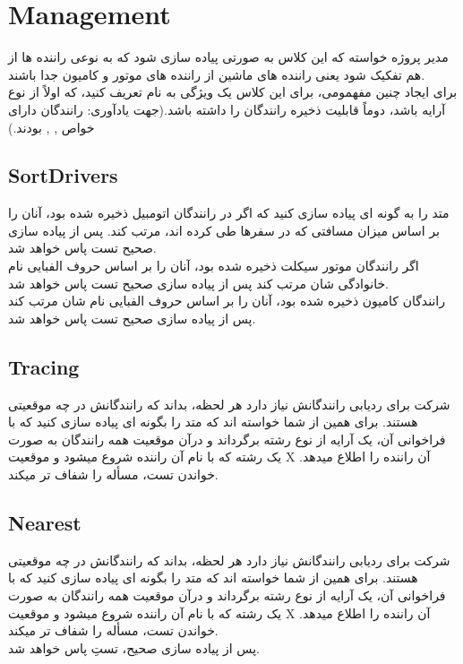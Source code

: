 \section{Management}
مدیر پروژه خواسته که این کلاس به صورتی پیاده سازی شود که به نوعی راننده ها از هم تفکیک شود یعنی راننده های ماشین از راننده های موتور و کامیون جدا باشند.
\\
برای ایجاد چنین مفهمومی، برای این کلاس یک ویژگی  به نام  تعریف کنید، که اولاً از نوع آرایه باشد، دوماً قابلیت ذخیره رانندگان را داشته باشد.(جهت یادآوری: رانندگان دارای خواص 
,
,
بودند.)
\\
\subsection{SortDrivers}
متد 
\grayBox{\textcolor{blue}{SortDrivers}}
را به گونه ای پیاده سازی کنید که اگر در 
رانندگان اتومبیل ذخیره شده بود، آنان را بر اساس میزان مسافتی که در سفرها طی کرده اند، مرتب کند.
پس از پیاده سازی صحیح تست 
\grayBox{\textcolor{dkgreen}{SortCarDriversTest}}
پاس خواهد شد.
\\
اگر
رانندگان موتور سیکلت ذخیره شده بود، آنان را بر اساس حروف الفبایی نام خانوادگی شان مرتب کند
 پس از پیاده سازی صحیح تست 
\grayBox{\textcolor{dkgreen}{SortMotorCycleDriversTest}}
پاس خواهد شد.
\\
رانندگان کامیون ذخیره شده بود، آنان را بر اساس حروف الفبایی نام شان مرتب کند
پس از پیاده سازی صحیح تست 
\grayBox{\textcolor{dkgreen}{SortTruckDriversTest}}
پاس خواهد شد.
\subsection{Tracing}
شرکت برای ردیابی رانندگانش نیاز دارد هر لحظه، بداند که رانندگانش در چه موقعیتی هستند.
برای همین از شما خواسته اند که متد 
\grayBox{\textcolor{blue}{WhereIsNow}}
را بگونه ای پیاده سازی کنید که با فراخوانی آن، یک آرایه از نوع رشته برگرداند و درآن موقعیت همه رانندگان به صورت یک رشته که با نام آن راننده شروع میشود و موقعیت Xِ آن راننده را اطلاع میدهد. خواندن تست، مسأله را شفاف تر میکند.

\subsection{Nearest}
شرکت برای ردیابی رانندگانش نیاز دارد هر لحظه، بداند که رانندگانش در چه موقعیتی هستند.
برای همین از شما خواسته اند که متد 
\grayBox{\textcolor{blue}{WhereIsNow}}
را بگونه ای پیاده سازی کنید که با فراخوانی آن، یک آرایه از نوع رشته برگرداند و درآن موقعیت همه رانندگان به صورت یک رشته که با نام آن راننده شروع میشود و موقعیت Xِ آن راننده را اطلاع میدهد. خواندن تست، مسأله را شفاف تر میکند.
\\
پس از پیاده سازی صحیح، تستِ 
\grayBox{\textcolor{dkgreen}{WhereIsDriversTest}}
پاس خواهد شد.
